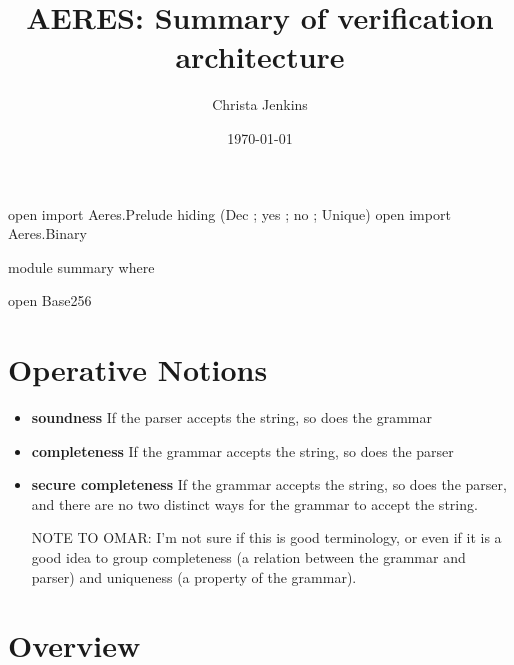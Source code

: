 \documentclass[11pt]{article}
\author{Christa Jenkins}
\date{\today}
\title{AERES: Summary of verification architecture}
\begin{document}
\maketitle
\begin{code}[hide]
open import Aeres.Prelude
  hiding (Dec ; yes ; no ; Unique)
open import Aeres.Binary

module summary where

open Base256
\end{code}


\section{Operative Notions}
\label{sec:org7332b29}

\begin{itemize}
\item \textbf{soundness} If the parser accepts the string, so does the grammar

\item \textbf{completeness} If the grammar accepts the string, so does the parser

\item \textbf{secure completeness} If the grammar accepts the string, so does the parser,
and there are no two distinct ways for the grammar to accept the string.

NOTE TO OMAR: I'm not sure if this is good terminology, or even if it is a
good idea to group completeness (a relation between the grammar and parser)
and uniqueness (a property of the grammar).
\end{itemize}

\section{Overview}
\label{sec:orgedf3fce}
\end{document}
